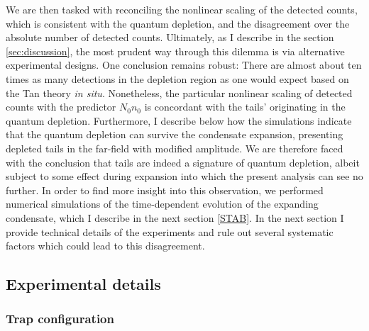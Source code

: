 	We are then tasked with reconciling the nonlinear scaling of the detected counts, which is consistent with the quantum depletion, and the disagreement over the absolute number of detected counts.
	Ultimately, as I describe in the section \ref {sec:discussion}, the most prudent way through this dilemma is via alternative experimental designs.
	One conclusion remains robust: There are {almost} about ten times as many detections in the depletion region as one would expect based on the Tan theory {\emph{in situ}}. 
	Nonetheless, the particular nonlinear scaling of detected counts with the predictor $N_0n_0$ is concordant with the tails' originating in the quantum depletion.
	Furthermore, I describe below how the simulations indicate that the quantum depletion can survive the condensate expansion, presenting depleted tails in the far-field with modified amplitude. 
	We are therefore faced with the conclusion that tails are indeed a signature of quantum depletion, albeit subject to some effect during expansion into which the present analysis can see no further. 
	In order to find more insight into this observation, we performed numerical simulations of the time-dependent evolution of the expanding condensate, which I describe in the next section \ref{STAB}.
	In the next section I provide technical details of the experiments and rule out several systematic factors which could lead to this disagreement.
 	
	


\subsection{Experimental details}
\label{sec:exp_details}
\subsubsection{Trap configuration}

